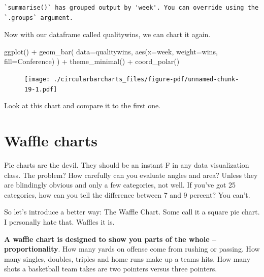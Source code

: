 \documentclass[
  letterpaper,
  DIV=11,
  numbers=noendperiod]{scrreprt}
\newenvironment{Shaded}{\begin{snugshade}}{\end{snugshade}}
\newcommand{\AttributeTok}[1]{\textcolor[rgb]{0.40,0.45,0.13}{#1}}
\newcommand{\FunctionTok}[1]{\textcolor[rgb]{0.28,0.35,0.67}{#1}}
\newcommand{\NormalTok}[1]{\textcolor[rgb]{0.00,0.23,0.31}{#1}}
\newcommand{\SpecialCharTok}[1]{\textcolor[rgb]{0.37,0.37,0.37}{#1}}
\begin{document}
\begin{verbatim}
`summarise()` has grouped output by 'week'. You can override using the
`.groups` argument.
\end{verbatim}

Now with our dataframe called qualitywins, we can chart it again.

\begin{Shaded}
\begin{Highlighting}[]
\FunctionTok{ggplot}\NormalTok{() }\SpecialCharTok{+} 
  \FunctionTok{geom\_bar}\NormalTok{(}
    \AttributeTok{data=}\NormalTok{qualitywins, }
    \FunctionTok{aes}\NormalTok{(}\AttributeTok{x=}\NormalTok{week, }\AttributeTok{weight=}\NormalTok{wins, }\AttributeTok{fill=}\NormalTok{Conference)}
\NormalTok{    ) }\SpecialCharTok{+} 
  \FunctionTok{theme\_minimal}\NormalTok{() }\SpecialCharTok{+} 
  \FunctionTok{coord\_polar}\NormalTok{()}
\end{Highlighting}
\end{Shaded}

\begin{figure}[H]

{\centering \texttt{[image: ./circularbarcharts\_files/figure-pdf/unnamed-chunk-19-1.pdf]}

}

\end{figure}

Look at this chart and compare it to the first one.


\hypertarget{waffle-charts}{%
\chapter{Waffle charts}\label{waffle-charts}}

Pie charts are the devil. They should be an instant F in any data
visualization class. The problem? How carefully can you evaluate angles
and area? Unless they are blindingly obvious and only a few categories,
not well. If you've got 25 categories, how can you tell the difference
between 7 and 9 percent? You can't.

So let's introduce a better way: The Waffle Chart. Some call it a square
pie chart. I personally hate that. Waffles it is.

\textbf{A waffle chart is designed to show you parts of the whole --
proportionality}. How many yards on offense come from rushing or
passing. How many singles, doubles, triples and home runs make up a
teams hits. How many shots a basketball team takes are two pointers
versus three pointers.
\end{document}
